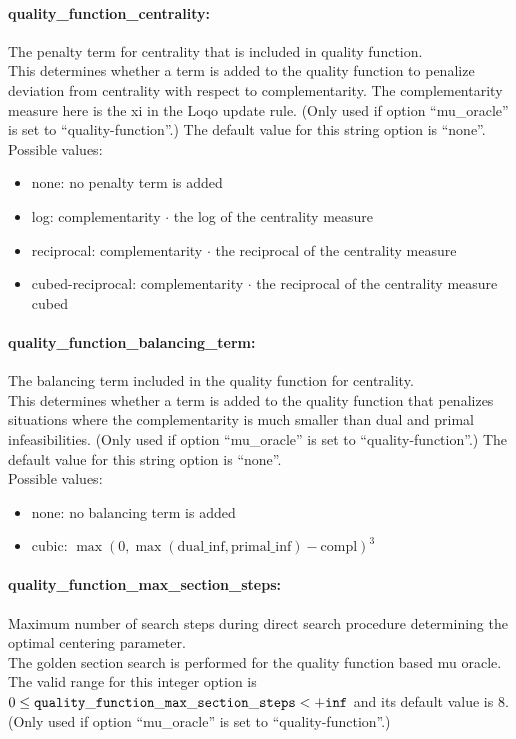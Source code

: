 \paragraph{quality\_function\_centrality:} The penalty term for centrality that is included in quality function. $\;$ \\
 This determines whether a term is added to the
quality function to penalize deviation from
centrality with respect to complementarity.  The
complementarity measure here is the xi in the
Loqo update rule. (Only used if option
``mu\_oracle'' is set to ``quality-function''.)
The default value for this string option is ``none''.
\\ 
Possible values:
\begin{itemize}
   \item none: no penalty term is added
   \item log: complementarity $\cdot$ the log of the centrality
measure
   \item reciprocal: complementarity $\cdot$ the reciprocal of the
centrality measure
   \item cubed-reciprocal: complementarity $\cdot$ the reciprocal of the
centrality measure cubed
\end{itemize}

\paragraph{quality\_function\_balancing\_term:} The balancing term included in the quality function for centrality. $\;$ \\
 This determines whether a term is added to the
quality function that penalizes situations where
the complementarity is much smaller than dual and
primal infeasibilities. (Only used if option
``mu\_oracle'' is set to ``quality-function''.)
The default value for this string option is ``none''.
\\ 
Possible values:
\begin{itemize}
   \item none: no balancing term is added
   \item cubic: $\max(0,\max(\textrm{dual\_inf},\textrm{primal\_inf})-\textrm{compl})^3$
\end{itemize}

\paragraph{quality\_function\_max\_section\_steps:} Maximum number of search steps during direct search procedure determining the optimal centering parameter. $\;$ \\
 The golden section search is performed for the
quality function based mu oracle. The valid range for this integer option is
$0 \le {\tt quality\_function\_max\_section\_steps } <  {\tt +inf}$
and its default value is $8$.
(Only used if
option ``mu\_oracle'' is set to ``quality-function''.)


